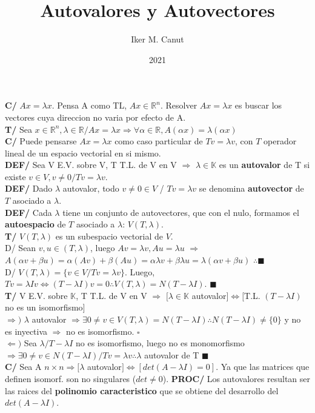 \documentclass[10pt,a4paper]{article}
\author{Iker M. Canut}
\title{Autovalores y Autovectores}
\date{2021}
\newcommand*{\QEDA}{\null\nobreak\hfill\ensuremath{\blacksquare}}
\newcommand*{\QEDB}{\null\nobreak\hfill\ensuremath{\square}}
\begin{document}
\textbf{C/} $Ax = \lambda x$. Pensa A como TL, $Ax \in \mathbb{R}^n$. Resolver $Ax=\lambda x$ es buscar los vectores cuya direccion no varia por efecto de A.\\ 
\textbf{T/} Sea $x \in \mathbb{R}^n, \lambda \in \mathbb{R} / Ax=\lambda x \Rightarrow \forall\alpha\in\mathbb{R}, A(\alpha x) = \lambda (\alpha x)$\\
\textbf{C/} Puede pensarse $Ax=\lambda x$ como caso particular de $Tv=\lambda v$, con $T$ operador lineal de un espacio vectorial en si mismo.\\
\textbf{DEF/} Sea V E.V. sobre V,  T T.L. de V en V $\Rightarrow$ $\lambda \in \mathbb{K}$ es un \textbf{autovalor} de T si existe $v \in V, v \not = 0 / Tv = \lambda v$.\\
\textbf{DEF/} Dado $\lambda$ autovalor, todo $v \not = 0 \in V$ / $Tv = \lambda v$ se denomina \textbf{autovector} de $T$ asociado a $\lambda$.\\
\textbf{DEF/} Cada $\lambda$ tiene un conjunto de autovectores, que con el nulo, formamos el \textbf{autoespacio} de $T$ asociado a $\lambda$: $V(T,\lambda)$.\\
\textbf{T/} $V(T, \lambda)$ es un subespacio vectorial de $V$.\\ D/ Sean $v,u \in (T, \lambda)$, luego $Av=\lambda v, Au=\lambda u$ $\Rightarrow$ $A(\alpha v + \beta u) = \alpha(Av) + \beta(Au) = \alpha\lambda v + \beta\lambda u = \lambda(\alpha v + \beta u)$ $\therefore $\QEDA\\ D/ $V(T, \lambda) = \{v \in V / Tv = \lambda v\}$. Luego, $Tv = \lambda I v \iff (T-\lambda I)v=0 \therefore V(T,\lambda) = N(T-\lambda I)$. \QEDA\\
\textbf{T/} V E.V. sobre $\mathbb{K}$, T T.L. de V en V $\Rightarrow$ $[\lambda \in \mathbb{K}$ autovalor$] \iff [$T.L. $(T-\lambda I)$ no es un isomorfismo$]$\\
$\Rightarrow)$ $\lambda$ autovalor $\Rightarrow \exists 0 \not = v \in V(T,\lambda)=N(T-\lambda I) \therefore N(T-\lambda I) \not = \{0\}$ y no es inyectiva $\Rightarrow$ no es isomorfismo. \QEDB\\
$\Leftarrow)$ Sea $\lambda/T-\lambda I$ no es isomorfismo, luego no es monomorfismo $\Rightarrow \exists 0 \not = v \in N(T-\lambda I) / Tv=\lambda v \therefore \lambda$ autovalor de T \QEDA\\
\textbf{C/} Sea A $n \times n \Rightarrow [\lambda $ autovalor$] \iff [det(A-\lambda I) = 0]$. Ya que las matrices que definen isomorf. son no singulares ($det \not = 0$).
\textbf{PROC/} Los autovalores resultan ser las raices del \textbf{polinomio caracteristico} que se obtiene del desarrollo del $det(A-\lambda I)$.\\
\end{document}
